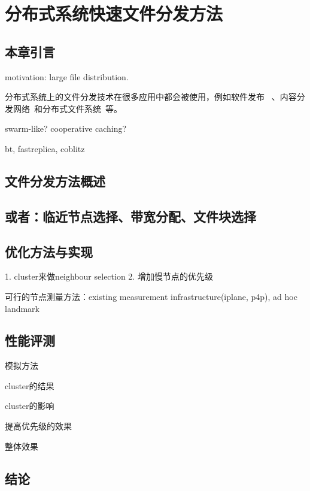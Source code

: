 \chapter{分布式系统快速文件分发方法}
\label{chap:bt}

\section{本章引言}

motivation: large file distribution.

分布式系统上的文件分发技术在很多应用中都会被使用，例如软件发布~
\cite{xxx}、内容分发网络~\cite{xxx}和分布式文件系统~\cite{xxx}等。

swarm-like? cooperative caching? 

bt, fastreplica, coblitz


\section{文件分发方法概述}


\section{或者：临近节点选择、带宽分配、文件块选择}

\section{优化方法与实现}

1. cluster来做neighbour selection
2. 增加慢节点的优先级

可行的节点测量方法：existing measurement infrastructure(iplane, p4p), ad hoc
landmark

\section{性能评测}

模拟方法

cluster的结果

cluster的影响

提高优先级的效果

整体效果

\section{结论}

